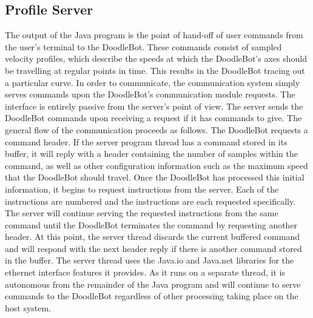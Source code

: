 \subsection{Profile Server}
The output of the Java program is the point of hand-off of user commands from the user's terminal to the DoodleBot. These commands consist of sampled velocity profiles, which describe the speeds at which the DoodleBot's axes should be travelling at regular points in time. This results in the DoodleBot tracing out a particular curve. In order to communicate, the communication system simply serves commands upon the DoodleBot's communication module requests. The interface is entirely passive from the server's point of view. The server sends the DoodleBot commands upon receiving a request if it has commands to give. The general flow of the communication proceeds as follows. The DoodleBot requests a command header. If the server program thread has a command stored in its buffer, it will reply with a header containing the number of samples within the command, as well as other configuration information such as the maximum speed that the DoodleBot should travel. Once the DoodleBot has processed this initial information, it begins to request instructions from the server. Each of the instructions are numbered and the instructions are each requested specifically. The server will continue serving the requested instructions from the same command until the DoodleBot terminates the command by requesting another header. At this point, the server thread discards the current buffered command and will respond with the next header reply if there is another command stored in the buffer.
The server thread uses the Java.io and Java.net libraries for the ethernet interface features it provides. As it runs on a separate thread, it is autonomous from the remainder of the Java program and will continue to serve commands to the DoodleBot regardless of other processing taking place on the host system.